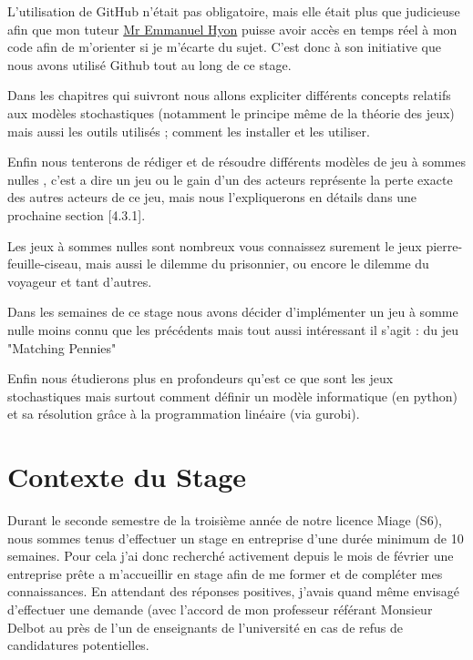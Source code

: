 \documentclass[a4paper, 12pt, twoside]{article}
\begin{document}
L'utilisation de \textsf{GitHub} n'était pas obligatoire, mais elle était plus que judicieuse afin que mon tuteur \underline{\textsf{Mr Emmanuel Hyon}} puisse avoir accès en temps réel à mon code afin de m'orienter si je m'écarte du sujet. C'est donc à son initiative que nous avons utilisé \textsf{Github} tout au long de ce stage. \newline

Dans les chapitres qui suivront nous allons expliciter différents concepts relatifs aux \textsf{ modèles stochastiques} (notamment le principe même de la théorie des jeux) mais aussi les outils utilisés ; comment les installer et les utiliser. \newline

Enfin nous tenterons de rédiger et de résoudre différents modèles de \textsf{jeu à sommes nulles} , c'est a dire un jeu ou le gain d'un des acteurs représente la perte exacte des autres acteurs de ce jeu, mais nous l'expliquerons en détails dans une prochaine section [4.3.1].  \newline

Les \textsf{jeux à sommes nulles} sont nombreux vous connaissez surement le jeux \textsf{pierre-feuille-ciseau}, mais aussi le \textsf{dilemme du prisonnier}, ou encore le \textsf{dilemme du voyageur} et tant d'autres. \newline

Dans les semaines de ce stage nous avons décider d'implémenter un \textsf{jeu à somme nulle} moins connu que les précédents mais tout aussi intéressant il s'agit : du jeu  \textsf{ "Matching Pennies"}\newline

Enfin nous étudierons plus en profondeurs qu'est ce que sont les jeux stochastiques mais surtout comment définir un modèle informatique (en \textsf{python}) et sa résolution grâce à la programmation linéaire (via \textsf{gurobi}).

\newpage
\section{Contexte du Stage}
Durant le seconde semestre de la troisième année de notre licence Miage (S6), nous sommes tenus d'effectuer un stage en entreprise d'une durée minimum de 10 semaines. Pour cela j'ai donc recherché activement depuis le mois de février une entreprise prête a m'accueillir en stage afin de me former et de compléter mes connaissances. En attendant des réponses positives, j'avais quand même envisagé d'effectuer une demande (avec l'accord de mon professeur référant \textsf{Monsieur Delbot} au près de l'un de enseignants de l'université en cas de refus de candidatures potentielles. \newline
\end{document}
